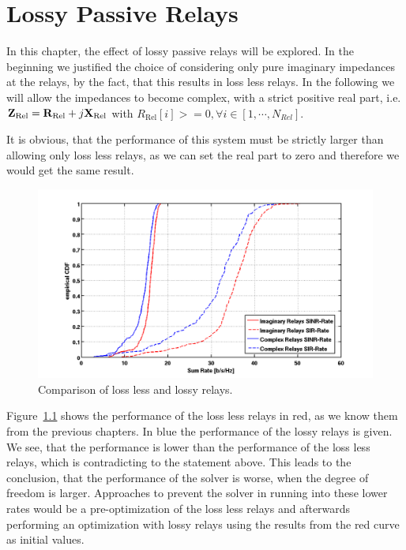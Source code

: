 \chapter{Lossy Passive Relays}
\label{sec:lossyrel}

In this chapter, the effect of lossy passive relays will be explored.
In the beginning we justified the choice of considering only pure imaginary impedances at the relays, by the fact, that this results in loss less relays.
In the following we will allow the impedances to become complex, with a strict positive real part, i.e.
$\mathbf{Z}_\text{Rel} = \mathbf{R}_\text{Rel} + j\mathbf{X}_\text{Rel}$ with $R_\text{Rel}[i]>=0,\forall i\in[1,\cdots,N_{Rel}]$.

It is obvious, that the performance of this system must be strictly larger than allowing only loss less relays, as we can set the real part to zero and therefore we would get the same result.

\begin{figure}[h]
\centering
  \includegraphics[width=\linewidth]{images/Imagvscomp.png}
\caption{Comparison of loss less and lossy relays.}
\label{fig:lossyrel}
\end{figure}

Figure~\ref{fig:lossyrel} shows the performance of the loss less relays in red, as we know them from the previous chapters.
In blue the performance of the lossy relays is given.
We see, that the performance is lower than the performance of the loss less relays, which is contradicting to the statement above.
This leads to the conclusion, that the performance of the solver is worse, when the degree of freedom is larger.
Approaches to prevent the solver in running into these lower rates would be a pre-optimization of the loss less relays and afterwards performing an optimization with lossy relays using the results from the red curve as initial values.

